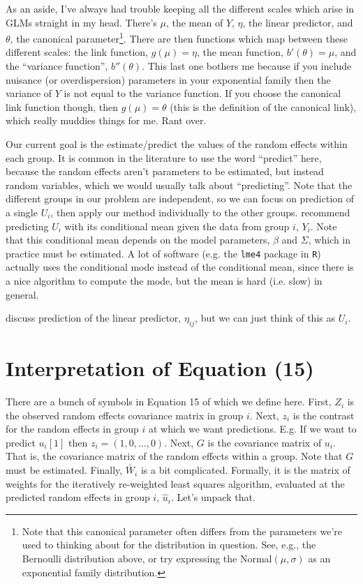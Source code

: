 \documentclass{article}
\begin{document}
As an aside, I've always had trouble keeping all the different scales which arise in GLMs straight in my head. There's $\mu$, the mean of $Y$, $\eta$, the linear predictor, and $\theta$, the canonical parameter\footnote{Note that this canonical parameter often differs from the parameters we're used to thinking about for the distribution in question. See, e.g., the Bernoulli distribution above, or try expressing the Normal$(\mu, \sigma)$ as an exponential family distribution.}. There are then functions which map between these different scales: the link function, $g(\mu) = \eta$, the mean function, $b'(\theta) = \mu$, and the ``variance function'', $b''(\theta)$. This last one bothers me because if you include nuisance (or overdispersion) parameters in your exponential family then the variance of $Y$ is not equal to the variance function. If you choose the canonical link function though, then $g(\mu) = \theta$ (this is the definition of the canonical link), which really muddies things for me. Rant over.

Our current goal is the estimate/predict the values of the random effects within each group. It is common in the literature to use the word ``predict'' here, because the random effects aren't parameters to be estimated, but instead random variables, which we would usually talk about ``predicting''. Note that the different groups in our problem are independent, so we can focus on prediction of a single $U_i$, then apply our method individually to the other groups. \citeauthor{Boo98} recommend predicting $U_i$ with its conditional mean given the data from group $i$, $Y_i$. Note that this conditional mean depends on the model parameters, $\beta$ and $\Sigma$, which in practice must be estimated. A lot of software (e.g. the \texttt{lme4} package in \texttt{R}) actually uses the conditional mode instead of the conditional mean, since there is a nice algorithm to compute the mode, but the mean is hard (i.e. slow) in general.

\citeauthor{Boo98} discuss prediction of the linear predictor, $\eta_{ij}$, but we can just think of this as $U_i$.

\section{Interpretation of Equation (15)}

There are a bunch of symbols in Equation 15 of \citeauthor{Boo98} which we define here. First, $Z_i$ is the observed random effects covariance matrix in group $i$. Next, $z_i$ is the contrast for the random effects in group $i$ at which we want predictions. E.g. If we want to predict $u_i[1]$ then $z_i = (1, 0, \ldots, 0)$. Next, $G$ is the covariance matrix of $u_i$. That is, the covariance matrix of the random effects within a group. Note that $G$ must be estimated. Finally, $\bar{W}_i$ is a bit complicated. Formally, it is the matrix of weights for the iteratively re-weighted least squares algorithm, evaluated at the predicted random effects in group $i$, $\hat{u}_i$. Let's unpack that.
\end{document}
